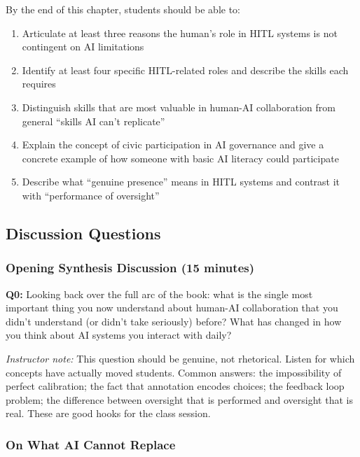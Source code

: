 By the end of this chapter, students should be able to:

\begin{enumerate}
    \item Articulate at least three reasons the human's role in HITL systems is not contingent on AI limitations
    \item Identify at least four specific HITL-related roles and describe the skills each requires
    \item Distinguish skills that are most valuable in human-AI collaboration from general ``skills AI can't replicate''
    \item Explain the concept of civic participation in AI governance and give a concrete example of how someone with basic AI literacy could participate
    \item Describe what ``genuine presence'' means in HITL systems and contrast it with ``performance of oversight''
\end{enumerate}

\subsection*{Discussion Questions}

\subsubsection*{Opening Synthesis Discussion (15 minutes)}

\textbf{Q0:} Looking back over the full arc of the book: what is the single most important thing you now understand about human-AI collaboration that you didn't understand (or didn't take seriously) before? What has changed in how you think about AI systems you interact with daily?

\textit{Instructor note:} This question should be genuine, not rhetorical. Listen for which concepts have actually moved students. Common answers: the impossibility of perfect calibration; the fact that annotation encodes choices; the feedback loop problem; the difference between oversight that is performed and oversight that is real. These are good hooks for the class session.

\subsubsection*{On What AI Cannot Replace}

